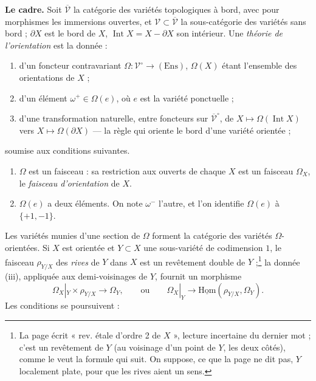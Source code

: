 \documentclass[11pt,a4paper]{article}
\begin{document}
\textbf{Le cadre.} Soit $\overline{\mathcal{V}}$ la catégorie des variétés
topologiques à bord, avec pour morphismes les immersions ouvertes, et
$\mathcal{V} \subset \overline{\mathcal{V}}$ la sous-catégorie des variétés sans
bord ; $\partial X$ est le bord de $X$, $\operatorname{Int} X = X - \partial X$
son intérieur. Une \emph{théorie de l'orientation} est la donnée :
\begin{enumerate}
  \item[(i)] d'un foncteur contravariant
  $\Omega : \mathcal{V}^{\circ} \to (\mathrm{Ens})$, $\Omega(X)$ étant
  l'ensemble des orientations de $X$ ;
  \item[(ii)] d'un élément $\omega^+ \in \Omega(e)$, où $e$ est la variété
  ponctuelle ;
  \item[(iii)] d'une transformation naturelle, entre foncteurs sur
  $\overline{\mathcal{V}}^{\circ}$, de $X \mapsto \Omega(\operatorname{Int} X)$
  vers $X \mapsto \Omega(\partial X)$ — la règle qui oriente le bord d'une
  variété orientée ;
\end{enumerate}
soumise aux conditions suivantes.
\begin{enumerate}
  \item[1°)] $\Omega$ est un faisceau : sa restriction aux ouverts de chaque
  $X$ est un faisceau $\Omega_X$, le \emph{faisceau d'orientation} de $X$.
  \item[2°)] $\Omega(e)$ a deux éléments. On note $\omega^-$ l'autre, et l'on
  identifie $\Omega(e)$ à $\{+1,-1\}$.
\end{enumerate}
Les variétés munies d'une section de $\Omega$ forment la catégorie des
variétés $\Omega$-orientées. Si $X$ est orientée et $Y \subset X$ une
sous-variété de codimension $1$, le faisceau $\rho_{Y/X}$ des \emph{rives} de
$Y$ dans $X$ est un revêtement double de $Y$ ;\footnote{La page écrit « rev.
étale d'ordre 2 de $X$ », lecture incertaine du dernier mot ; c'est un
revêtement de $Y$ (au voisinage d'un point de $Y$, les deux côtés), comme
le veut la formule qui suit. On suppose, ce que la page ne dit pas, $Y$
localement plate, pour que les rives aient un sens.} la donnée (iii),
appliquée aux demi-voisinages de $Y$, fournit un morphisme
\[
  \Omega_X|_Y \times \rho_{Y/X} \longrightarrow \Omega_Y ,
  \qquad\text{ou}\qquad
  \Omega_X|_Y \longrightarrow \underline{\mathrm{Hom}}(\rho_{Y/X}, \Omega_Y).
\]
Les conditions se poursuivent :
\end{document}
